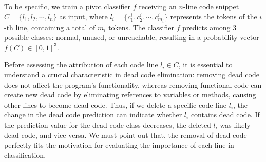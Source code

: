 \documentclass[11pt]{article}
\begin{document}


To be specific, we train a pivot classifier $f$ receiving an $n$-line code snippet $C = \{l_1, l_2, \cdots, l_n\}$ as input, where $l_i = \{c_1^i, c_2^i, \cdots, c_{m_i}^i\}$ represents the tokens of the $i$-th line, containing a total of $m_i$ tokens. The classifier $f$ predicts among 3 possible classes: normal, unused, or unreachable, resulting in a probability vector $f(C) \in [0, 1]^3$.

Before assessing the attribution of each code line $l_i \in C$, it is essential to understand a crucial characteristic in dead code elimination: removing dead code does not affect the program's functionality, whereas removing functional code can create new dead code by eliminating references to variables or methods, causing other lines to become dead code. Thus, if we delete a specific code line $l_i$, the change in the dead code prediction can indicate whether $l_i$ contains dead code. If the prediction value for the dead code class decreases, the deleted $l_i$ was likely dead code, and vice versa. We must point out that, the removal of dead code perfectly fits the motivation for evaluating the importance of each line in classification.
\end{document}
